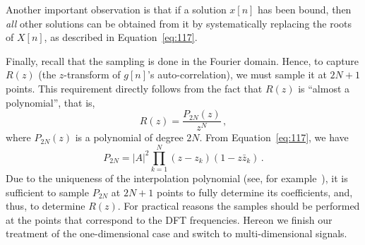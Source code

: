 Another important observation is that if a solution $x[n]$ has been bound,
then \emph{all} other solutions can be obtained from it by
systematically replacing the roots of $X[n]$, as described in
Equation~\eqref{eq:117}.\footnotemark[1]{}

Finally, recall that the sampling is done in the Fourier
domain. Hence, to capture $R(z)$ (the $z$-transform of $g[n]$'s
auto-correlation), we must sample it at $2N+1$ points. This requirement
directly follows from the fact that $R(z)$ is ``almost a polynomial'',
that is, 
\begin{equation}
  \label{eq:122}
  R(z) = \frac{P_{2N}(z)}{z^{N}} \,, 
\end{equation}
where $P_{2N}(z)$ is a polynomial of degree $2N$. From
Equation~\eqref{eq:117}, we have
\begin{equation}
  \label{eq:123}
  P_{2N} =  |A|^{2}\prod_{k=1}^{N}(z-z_{k})
  \left(
    1 - z\bar z_{k}
  \right) \,.
\end{equation}
Due to the uniqueness of the interpolation polynomial (see, for
example~), it is sufficient to sample
$P_{2N}$ at $2N+1$ points to fully determine its coefficients, and, thus,
to determine $R(z)$. For practical reasons the samples should be
performed at the points that correspond to the DFT frequencies. Hereon
we finish our treatment of the one-dimensional case and switch to
multi-dimensional signals.

